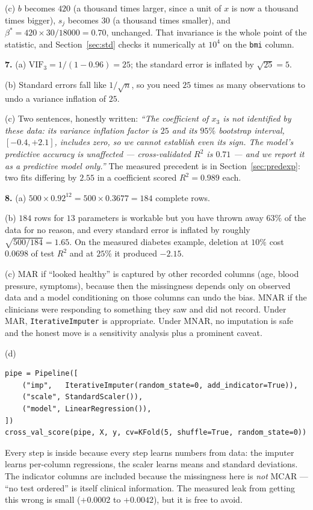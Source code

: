 \documentclass[11pt]{article}
\begin{document}
(c) $b$ becomes $420$ (a thousand times larger, since a unit of $x$ is now a
thousand times bigger), $s_j$ becomes $30$ (a thousand times smaller), and
$\beta^* = 420\times30/18000 = 0.70$, unchanged. That invariance is the whole
point of the statistic, and Section~\ref{sec:std} checks it numerically at
$10^4$ on the \texttt{bmi} column.

\medskip
\textbf{7.} (a) $\mathrm{VIF}_3 = 1/(1-0.96) = 25$; the standard error is
inflated by $\sqrt{25} = 5$.

(b) Standard errors fall like $1/\sqrt{n}$, so you need $25$ times as many
observations to undo a variance inflation of $25$.

(c) Two sentences, honestly written: \emph{``The coefficient of $x_3$ is not
identified by these data: its variance inflation factor is $25$ and its $95\%$
bootstrap interval, $[-0.4, +2.1]$, includes zero, so we cannot establish even
its sign. The model's predictive accuracy is unaffected --- cross-validated
$R^2$ is $0.71$ --- and we report it as a predictive model only.''} The
measured precedent is in Section~\ref{sec:predexp}: two fits differing by
$2.55$ in a coefficient scored $R^2 = 0.989$ each.

\medskip
\textbf{8.} (a) $500 \times 0.92^{12} = 500 \times 0.3677 = 184$ complete
rows.

(b) $184$ rows for $13$ parameters is workable but you have thrown away $63\%$
of the data for no reason, and every standard error is inflated by roughly
$\sqrt{500/184} = 1.65$. On the measured diabetes example, deletion at $10\%$
cost $0.0698$ of test $R^2$ and at $25\%$ it produced $-2.15$.

(c) MAR if ``looked healthy'' is captured by other recorded columns (age,
blood pressure, symptoms), because then the missingness depends only on
observed data and a model conditioning on those columns can undo the bias.
MNAR if the clinicians were responding to something they saw and did not
record. Under MAR, \texttt{IterativeImputer} is appropriate. Under MNAR, no
imputation is safe and the honest move is a sensitivity analysis plus a
prominent caveat.

(d)
\begin{lstlisting}
pipe = Pipeline([
    ("imp",   IterativeImputer(random_state=0, add_indicator=True)),
    ("scale", StandardScaler()),
    ("model", LinearRegression()),
])
cross_val_score(pipe, X, y, cv=KFold(5, shuffle=True, random_state=0))
\end{lstlisting}
Every step is inside because every step learns numbers from data: the
imputer learns per-column regressions, the scaler learns means and standard
deviations. The indicator columns are included because the missingness here is
\emph{not} MCAR --- ``no test ordered'' is itself clinical information. The
measured leak from getting this wrong is small ($+0.0002$ to $+0.0042$), but
it is free to avoid.
\end{document}
